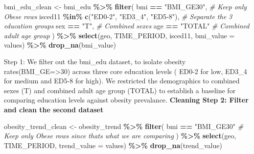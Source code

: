 \documentclass[
]{article}
\newenvironment{Shaded}{\begin{snugshade}}{\end{snugshade}}
\newcommand{\AttributeTok}[1]{\textcolor[rgb]{0.13,0.29,0.53}{#1}}
\newcommand{\CommentTok}[1]{\textcolor[rgb]{0.56,0.35,0.01}{\textit{#1}}}
\newcommand{\FunctionTok}[1]{\textcolor[rgb]{0.13,0.29,0.53}{\textbf{#1}}}
\newcommand{\NormalTok}[1]{#1}
\newcommand{\OtherTok}[1]{\textcolor[rgb]{0.56,0.35,0.01}{#1}}
\newcommand{\SpecialCharTok}[1]{\textcolor[rgb]{0.81,0.36,0.00}{\textbf{#1}}}
\newcommand{\StringTok}[1]{\textcolor[rgb]{0.31,0.60,0.02}{#1}}
\begin{document}
\begin{Shaded}
\begin{Highlighting}[]
\NormalTok{bmi\_edu\_clean }\OtherTok{\textless{}{-}}\NormalTok{ bmi\_edu }\SpecialCharTok{\%\textgreater{}\%}
  \FunctionTok{filter}\NormalTok{(}
\NormalTok{    bmi }\SpecialCharTok{==} \StringTok{"BMI\_GE30"}\NormalTok{,                        }\CommentTok{\# Keep only Obese rows}
\NormalTok{    isced11 }\SpecialCharTok{\%in\%} \FunctionTok{c}\NormalTok{(}\StringTok{"ED0{-}2"}\NormalTok{, }\StringTok{"ED3\_4"}\NormalTok{, }\StringTok{"ED5{-}8"}\NormalTok{), }\CommentTok{\# Separate the 3 education groups}
\NormalTok{    sex }\SpecialCharTok{==} \StringTok{"T"}\NormalTok{,                              }\CommentTok{\# Combined sexes}
\NormalTok{    age }\SpecialCharTok{==} \StringTok{"TOTAL"}                          \CommentTok{\# Combined adult age group}
\NormalTok{  ) }\SpecialCharTok{\%\textgreater{}\%}
  \FunctionTok{select}\NormalTok{(geo, TIME\_PERIOD, isced11, }\AttributeTok{bmi\_value =}\NormalTok{ values) }\SpecialCharTok{\%\textgreater{}\%}
  \FunctionTok{drop\_na}\NormalTok{(bmi\_value)}
  
\end{Highlighting}
\end{Shaded}

Step 1: We filter out the bmi\_edu dataset, to isolate obesity
rates(BMI\_GE=\textgreater30) across three core education levels ( ED0-2
for low, ED3\_4 for medium and ED5-8 for high). We restricted the
demographics to combined sexes (T) and combined adult age group (TOTAL)
to establish a baseline for comparing education levels against obesity
prevalance. \textbf{Cleaning Step 2: Filter and clean the second
dataset}

\begin{Shaded}
\begin{Highlighting}[]

\NormalTok{obesity\_trend\_clean }\OtherTok{\textless{}{-}}\NormalTok{ obesity\_trend }\SpecialCharTok{\%\textgreater{}\%}
  \FunctionTok{filter}\NormalTok{(}
\NormalTok{    bmi }\SpecialCharTok{==} \StringTok{"BMI\_GE30"} \CommentTok{\# Keep only Obese rows since that\textquotesingle{}s what we are comparing}
\NormalTok{  ) }\SpecialCharTok{\%\textgreater{}\%}
  \FunctionTok{select}\NormalTok{(geo, TIME\_PERIOD, }\AttributeTok{trend\_value =}\NormalTok{ values) }\SpecialCharTok{\%\textgreater{}\%}
  \FunctionTok{drop\_na}\NormalTok{(trend\_value)}
\end{Highlighting}
\end{Shaded}
\end{document}
